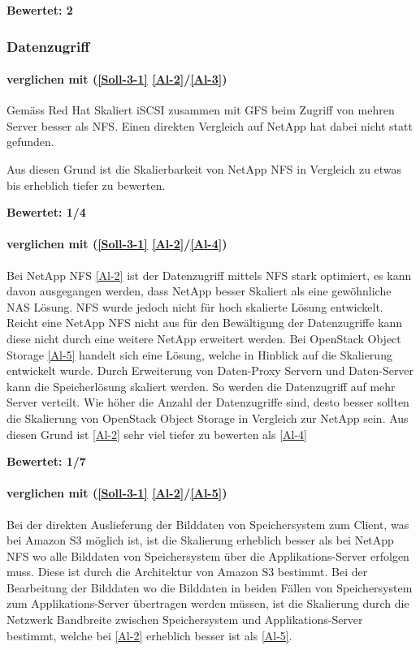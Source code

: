 \textbf{Bewertet: 2}


\subsubsection{Datenzugriff}

\paragraph*{  verglichen mit  (\ref{Soll-3-1} \ref{Al-2}/\ref{Al-3})}
Gemäss Red Hat Skaliert iSCSI zusammen mit GFS beim Zugriff von mehren Server besser als NFS. Einen direkten Vergleich auf NetApp hat dabei nicht statt gefunden. 
\cite{O'Keefe2005}

Aus diesen Grund ist die Skalierbarkeit von NetApp NFS  in Vergleich zu  etwas bis erheblich tiefer zu bewerten.

\textbf{Bewertet: 1/4}

\paragraph*{  verglichen mit  (\ref{Soll-3-1} \ref{Al-2}/\ref{Al-4})}
Bei NetApp NFS \ref{Al-2} ist der Datenzugriff mittels NFS stark optimiert, es kann davon ausgegangen werden, dass NetApp besser Skaliert als eine gewöhnliche NAS Lösung. NFS wurde jedoch nicht für hoch skalierte Lösung entwickelt. Reicht eine NetApp NFS nicht aus für den Bewältigung der Datenzugriffe kann diese nicht durch eine weitere NetApp erweitert werden. Bei OpenStack Object Storage \ref{Al-5} handelt sich eine Lösung, welche in Hinblick auf die Skalierung entwickelt wurde. Durch Erweiterung von Daten-Proxy Servern und Daten-Server kann die Speicherlösung skaliert werden. So werden die Datenzugriff auf mehr Server verteilt. Wie höher die Anzahl der Datenzugriffe sind, desto besser sollten die Skalierung von OpenStack Object Storage in Vergleich zur NetApp sein.
Aus diesen Grund ist \ref{Al-2} sehr viel tiefer zu bewerten als \ref{Al-4}

\textbf{Bewertet: 1/7}

\paragraph*{  verglichen mit  (\ref{Soll-3-1} \ref{Al-2}/\ref{Al-5})}
Bei der direkten Auslieferung der Bilddaten von Speichersystem zum Client, was bei Amazon S3 möglich ist, ist die Skalierung erheblich besser als bei NetApp NFS wo alle Bilddaten von Speichersystem über die Applikations-Server erfolgen muss. Diese ist durch die Architektur von Amazon S3 bestimmt. Bei der Bearbeitung der Bilddaten wo die Bilddaten in beiden Fällen von Speichersystem zum Applikations-Server übertragen werden müssen, ist die Skalierung durch die Netzwerk Bandbreite zwischen Speichersystem und Applikations-Server bestimmt, welche bei \ref{Al-2} erheblich besser ist als \ref{Al-5}.


